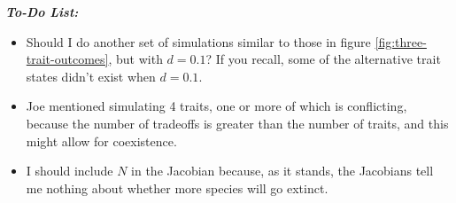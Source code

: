\textbf{\textit{To-Do List:} }
\begin{itemize}
\item Should I do another set of simulations similar to those in figure
    \ref{fig:three-trait-outcomes}, but with $d = 0.1$? If you recall, some
    of the alternative trait states didn't exist when $d = 0.1$.
\item Joe mentioned simulating 4 traits, one or more of which is conflicting,
    because the number of tradeoffs is greater than the number of traits,
    and this might allow for coexistence.
\item I should include $N$ in the Jacobian because, as it stands, the Jacobians
    tell me nothing about whether more species will go extinct.
\end{itemize}

